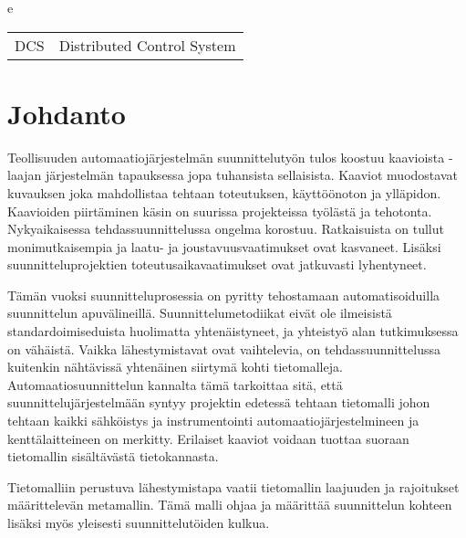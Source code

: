 e	\documentclass[finnish,12pt]{article}
\begin{document}

	\begin{tabular}{ll}
DCS        & Distributed Control System \\

	\end{tabular}

	\cleardoublepage
	\storeinipagenumber
	\setcounter{page}{1}

	\section{Johdanto}
	\thispagestyle{empty}

Teollisuuden automaatiojärjestelmän suunnittelutyön tulos koostuu kaavioista -
laajan järjestelmän tapauksessa jopa tuhansista sellaisista. Kaaviot muodostavat
kuvauksen joka mahdollistaa tehtaan toteutuksen, käyttöönoton ja ylläpidon.
Kaavioiden piirtäminen käsin on suurissa projekteissa työlästä ja tehotonta.
Nykyaikaisessa tehdassuunnittelussa ongelma korostuu. Ratkaisuista on tullut
monimutkaisempia ja laatu- ja joustavuusvaatimukset ovat kasvaneet. Lisäksi
suunnitteluprojektien toteutusaikavaatimukset ovat jatkuvasti lyhentyneet.
\cite{RefWorks:41}

Tämän vuoksi suunnitteluprosessia on pyritty tehostamaan automatisoiduilla
suunnittelun apuvälineillä. Suunnittelumetodiikat eivät ole
ilmeisistä standardoimiseduista huolimatta yhtenäistyneet, ja yhteistyö alan
tutkimuksessa on vähäistä. Vaikka lähestymistavat ovat vaihtelevia, on
tehdassuunnittelussa kuitenkin nähtävissä yhtenäinen siirtymä kohti 
tietomalleja. Automaatiosuunnittelun kannalta tämä tarkoittaa sitä, että
suunnittelujärjestelmään syntyy projektin edetessä tehtaan
tietomalli johon tehtaan kaikki sähköistys ja instrumentointi
automaatiojärjestelmineen ja kenttälaitteineen on merkitty. Erilaiset kaaviot
voidaan tuottaa suoraan tietomallin sisältävästä tietokannasta.

Tietomalliin perustuva lähestymistapa vaatii tietomallin laajuuden ja rajoitukset
määrittelevän metamallin. Tämä malli ohjaa ja määrittää suunnittelun kohteen lisäksi
myös yleisesti suunnittelutöiden kulkua.
\end{document}
